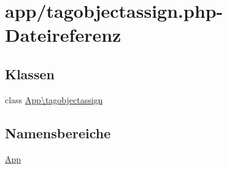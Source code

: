 \hypertarget{tagobjectassign_8php}{}\section{app/tagobjectassign.php-\/\+Dateireferenz}
\label{tagobjectassign_8php}
\subsection*{Klassen}
\begin{DoxyCompactItemize}
\item 
class \hyperlink{classApp_1_1tagobjectassign}{App\textbackslash{}tagobjectassign}
\end{DoxyCompactItemize}
\subsection*{Namensbereiche}
\begin{DoxyCompactItemize}
\item 
 \hyperlink{namespaceApp}{App}
\end{DoxyCompactItemize}
